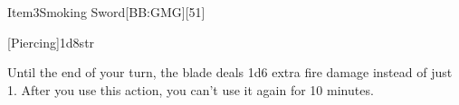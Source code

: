 
\begin{card}{Item}{3}{Smoking Sword}[BB:GMG][51]




[Piercing]{1d8}{str}



Until the end of your turn, the blade deals 1d6 extra fire damage instead of just 1. After you use this action, you can't use it again for 10 minutes.

\vfill

\end{card}